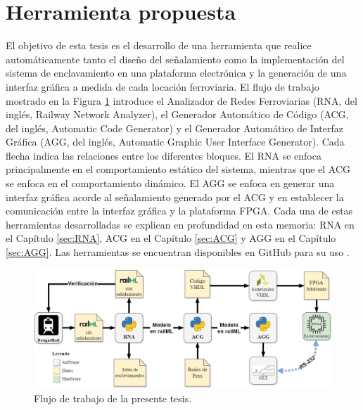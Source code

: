 \section{Herramienta propuesta}

    El objetivo de esta tesis es el desarrollo de una herramienta que realice automáticamente tanto el diseño del señalamiento como la implementación del sistema de enclavamiento en una plataforma electrónica y la generación de una interfaz gráfica a medida de cada locación ferroviaria. El flujo de trabajo mostrado en la Figura \ref{fig:workflow} introduce el Analizador de Redes Ferroviarias (RNA, del inglés, Railway Network Analyzer), el Generador Automático de Código (ACG, del inglés, Automatic Code Generator) y el Generador Automático de Interfaz Gráfica (AGG, del inglés, Automatic Graphic User Interface Generator). Cada flecha indica las relaciones entre los diferentes bloques. El RNA se enfoca principalmente en el comportamiento estático del sistema, mientras que el ACG se enfoca en el comportamiento dinámico. El AGG se enfoca en generar una interfaz gráfica acorde al señalamiento generado por el ACG y en establecer la comunicación entre la interfaz gráfica y la plataforma FPGA. Cada una de estas herramientas desarrolladas se explican en profundidad en esta memoria: RNA en el Capítulo \ref{sec:RNA}, ACG en el Capítulo \ref{sec:ACG} y AGG en el Capítulo \ref{sec:AGG}. Las herramientas se encuentran disponibles en GitHub para su uso \cite{GITHUB_PHD}.

    \begin{figure}[H]
        \centering
        \includegraphics[width=1\textwidth]{Figuras/workflow.png}
        \centering\caption{Flujo de trabajo de la presente tesis.}
        \label{fig:workflow}
    \end{figure}

